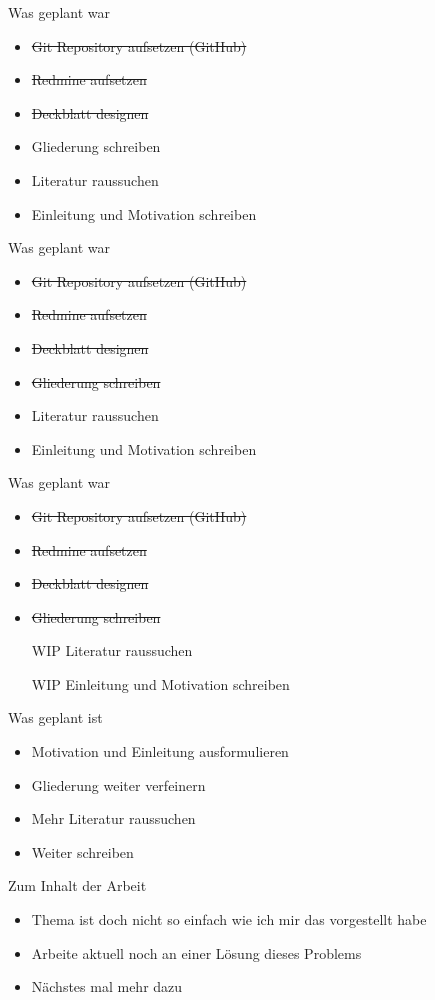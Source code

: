 \documentclass{beamer}
\begin{document}
\begin{frame}{Was geplant war}
  \begin{itemize}
    \item \sout{Git Repository aufsetzen (GitHub)}
    \item \sout{Redmine aufsetzen}
    \item \sout{Deckblatt designen}
    \item Gliederung schreiben
    \item Literatur raussuchen
    \item Einleitung und Motivation schreiben
  \end{itemize}
\end{frame}

\begin{frame}{Was geplant war}
  \begin{itemize}
    \item \sout{Git Repository aufsetzen (GitHub)}
    \item \sout{Redmine aufsetzen}
    \item \sout{Deckblatt designen}
    \item \sout{Gliederung schreiben}
    \item Literatur raussuchen
    \item Einleitung und Motivation schreiben
  \end{itemize}
\end{frame}

\begin{frame}{Was geplant war}
  \begin{itemize}
    \item \sout{Git Repository aufsetzen (GitHub)}
    \item \sout{Redmine aufsetzen}
    \item \sout{Deckblatt designen}
    \item \sout{Gliederung schreiben}
    \item [WIP] Literatur raussuchen
    \item [WIP] Einleitung und Motivation schreiben
  \end{itemize}
\end{frame}

\begin{frame}{Was geplant ist}
  \begin{itemize}
    \item Motivation und Einleitung ausformulieren
    \item Gliederung weiter verfeinern
    \item Mehr Literatur raussuchen
    \item Weiter schreiben
  \end{itemize}
\end{frame}

\begin{frame}{Zum Inhalt der Arbeit}
  \begin{itemize}
    \item Thema ist doch nicht so einfach wie ich mir das vorgestellt habe
    \item Arbeite aktuell noch an einer Lösung dieses Problems
    \item Nächstes mal mehr dazu
  \end{itemize}
\end{frame}
\end{document}
